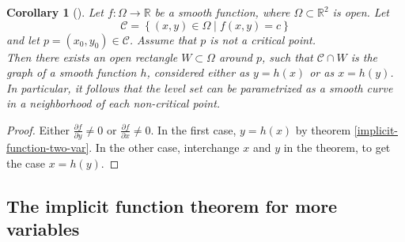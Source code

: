 \documentclass[reqno]{amsart}
\theoremstyle{plain}%
\newtheorem{corollary}[theorem]{Corollary}
\theoremstyle{definition}
\theoremstyle{remark}
\begin{document}
\begin{corollary}[]
    Let $f  \colon \Omega \to \mathbb{R}$ be a smooth function, where
    $\Omega \subset \mathbb{R}^2$ is open. Let
    \[
    \mathcal{C} = \left\{ \left( x,y \right) \in \Omega  \mid 
    f(x,y) = c \right\} 
    \] 
    and let $p = \left( x_0, y_0 \right) \in \mathcal{C}$. Assume that
    $p$ is not a critical point.\\
    Then there exists an open rectangle $W \subset \Omega$ around $p$, such
    that $\mathcal{C} \cap W$ is the graph of a smooth function $h$, considered
    either as $y = h(x)$ or as $x = h(y)$.\\
    In particular, it follows that the level set can be parametrized as
    a smooth curve in a neighborhood of each non-critical point.
\end{corollary}
\begin{proof}
    Either $\frac{\partial f}{\partial y}\neq 0$ or
    $\frac{\partial f}{\partial x}\neq 0$. In the first case,
    $y = h(x)$ by theorem \ref{implicit-function-two-var}. In the other case,
    interchange $x$ and $y$ in the theorem, to get the case
    $x = h(y)$.
 \end{proof}

 \subsection{The implicit function theorem for more variables}
\end{document}
